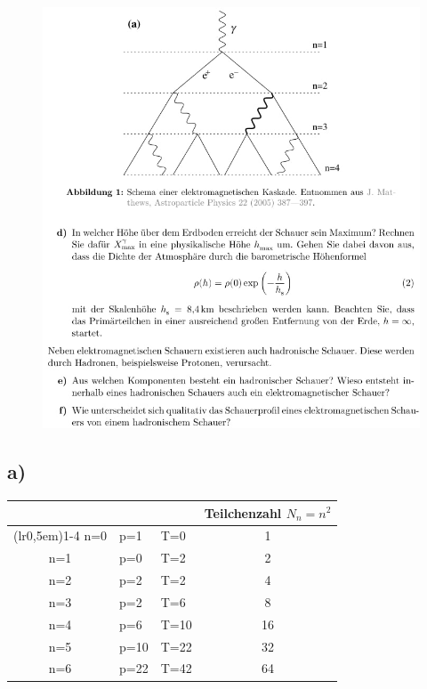     \begin{figure}[H]
        \centering
        \includegraphics[width=\textwidth]{images/Aufgabe19b.jpg}
        \label{fig:2}
    \end{figure}

\subsection{a)}

\begin{table}[H]
\centering
    \begin{tabular}{c l l c}
    \toprule
    \multicolumn{1}{c}{} & \multicolumn{1}{c}{} & \multicolumn{1}{c}{} & \multicolumn{1}{c}{Teilchenzahl $N_n=n^2$}\\
    \cmidrule(lr{0,5em}){1-4}
    n=0 & p=1 & T=0 & 1\\        
    n=1 & p=0 & T=2 & 2\\       
    n=2 & p=2 & T=2 & 4\\
    n=3 & p=2 & T=6 & 8\\
    n=4 & p=6 & T=10 & 16\\
    n=5 & p=10 & T=22 & 32\\        
    n=6 & p=22 & T=42 & 64\\
    \bottomrule
    \end{tabular}
\label{tab:1}
\end{table}

